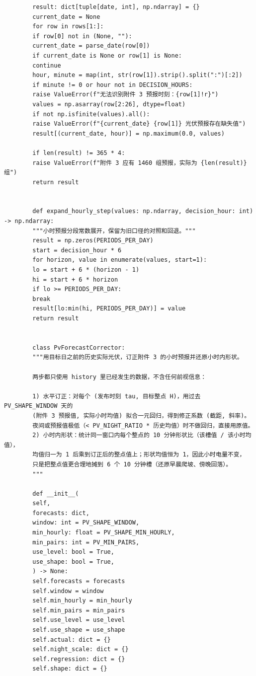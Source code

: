 \documentclass[UTF8]{ctexart}
\begin{document}
\begin{verbatim}
        result: dict[tuple[date, int], np.ndarray] = {}
        current_date = None
        for row in rows[1:]:
        if row[0] not in (None, ""):
        current_date = parse_date(row[0])
        if current_date is None or row[1] is None:
        continue
        hour, minute = map(int, str(row[1]).strip().split(":")[:2])
        if minute != 0 or hour not in DECISION_HOURS:
        raise ValueError(f"无法识别附件 3 预报时刻：{row[1]!r}")
        values = np.asarray(row[2:26], dtype=float)
        if not np.isfinite(values).all():
        raise ValueError(f"{current_date} {row[1]} 光伏预报存在缺失值")
        result[(current_date, hour)] = np.maximum(0.0, values)
        
        if len(result) != 365 * 4:
        raise ValueError(f"附件 3 应有 1460 组预报，实际为 {len(result)} 组")
        return result
        
        
        def expand_hourly_step(values: np.ndarray, decision_hour: int) -> np.ndarray:
        """小时预报分段常数展开，保留为旧口径的对照和回退。"""
        result = np.zeros(PERIODS_PER_DAY)
        start = decision_hour * 6
        for horizon, value in enumerate(values, start=1):
        lo = start + 6 * (horizon - 1)
        hi = start + 6 * horizon
        if lo >= PERIODS_PER_DAY:
        break
        result[lo:min(hi, PERIODS_PER_DAY)] = value
        return result
        
        
        class PvForecastCorrector:
        """用目标日之前的历史实际光伏，订正附件 3 的小时预报并还原小时内形状。
        
        两步都只使用 history 里已经发生的数据，不含任何前视信息：
        
        1) 水平订正：对每个 (发布时刻 tau, 目标整点 H)，用过去 PV_SHAPE_WINDOW 天的
        (附件 3 预报值, 实际小时均值) 拟合一元回归，得到修正系数 (截距, 斜率)。
        夜间或预报值极低（< PV_NIGHT_RATIO * 历史均值）时不做回归，直接用原值。
        2) 小时内形状：统计同一窗口内每个整点的 10 分钟形状比（该槽值 / 该小时均值），
        均值归一为 1 后乘到订正后的整点值上；形状均值恒为 1，因此小时电量不变，
        只是把整点值更合理地摊到 6 个 10 分钟槽（还原早晨爬坡、傍晚回落）。
        """
        
        def __init__(
        self,
        forecasts: dict,
        window: int = PV_SHAPE_WINDOW,
        min_hourly: float = PV_SHAPE_MIN_HOURLY,
        min_pairs: int = PV_MIN_PAIRS,
        use_level: bool = True,
        use_shape: bool = True,
        ) -> None:
        self.forecasts = forecasts
        self.window = window
        self.min_hourly = min_hourly
        self.min_pairs = min_pairs
        self.use_level = use_level
        self.use_shape = use_shape
        self.actual: dict = {}
        self.night_scale: dict = {}
        self.regression: dict = {}
        self.shape: dict = {}
        

\end{verbatim}
\end{document}
